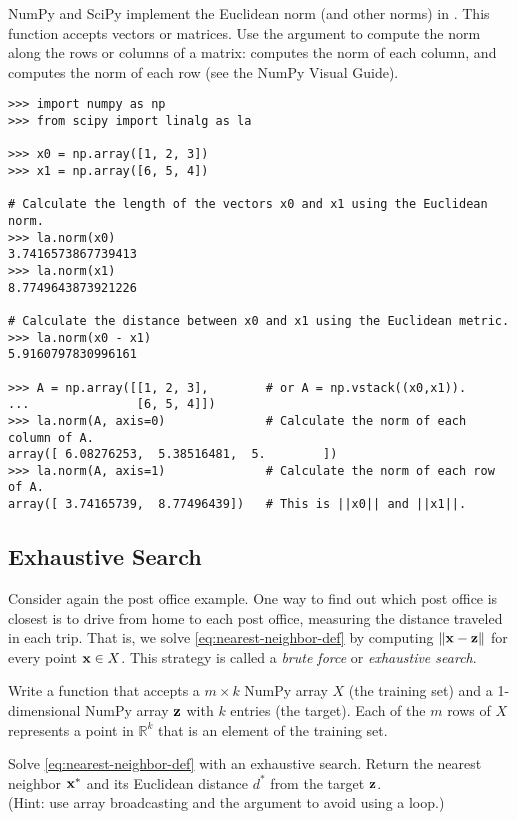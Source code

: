 NumPy and SciPy implement the Euclidean norm (and other norms) in .
This function accepts vectors or matrices.
Use the  argument to compute the norm along the rows or columns of a matrix:  computes the norm of each column, and  computes the norm of each row (see the NumPy Visual Guide).

\begin{lstlisting}
>>> import numpy as np
>>> from scipy import linalg as la

>>> x0 = np.array([1, 2, 3])
>>> x1 = np.array([6, 5, 4])

# Calculate the length of the vectors x0 and x1 using the Euclidean norm.
>>> la.norm(x0)
3.7416573867739413
>>> la.norm(x1)
8.7749643873921226

# Calculate the distance between x0 and x1 using the Euclidean metric.
>>> la.norm(x0 - x1)
5.9160797830996161

>>> A = np.array([[1, 2, 3],        # or A = np.vstack((x0,x1)).
...               [6, 5, 4]])
>>> la.norm(A, axis=0)              # Calculate the norm of each column of A.
array([ 6.08276253,  5.38516481,  5.        ])
>>> la.norm(A, axis=1)              # Calculate the norm of each row of A.
array([ 3.74165739,  8.77496439])   # This is ||x0|| and ||x1||.
\end{lstlisting}

\subsection*{Exhaustive Search} %

Consider again the post office example.
One way to find out which post office is closest is to drive from home to each post office, measuring the distance traveled in each trip.
That is, we solve \eqref{eq:nearest-neighbor-def} by computing $\|\mathbf{x} - \mathbf{z}\|$ for every point $\mathbf{x}\in X$.
This strategy is called a \emph{brute force} or \emph{exhaustive search}.

\begin{problem} %
Write a function that accepts a $m\times k$ NumPy array $X$ (the training set) and a 1-dimensional NumPy array $\mathbf{z}$ with $k$ entries (the target).
Each of the $m$ rows of $X$ represents a point in $\mathbb{R}^k$ that is an element of the training set.

Solve \eqref{eq:nearest-neighbor-def} with an exhaustive search.
Return the nearest neighbor $\mathbf{x}^*$ and its Euclidean distance $d^*$ from the target $\mathbf{z}$.
\\(Hint: use array broadcasting and the  argument to avoid using a loop.)
\label{prob:nearest-neighbor-exhaustive-search}
\end{problem}

